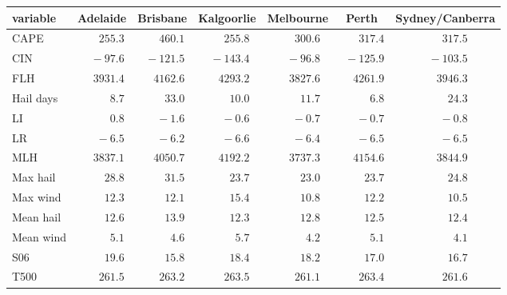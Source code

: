\begin{tabular}{lcccccc}
\hline
variable  & Adelaide & Brisbane & Kalgoorlie & Melbourne & Perth & \multicolumn{1}{c}{Sydney/Canberra} \\ 
\hline
CAPE  & $\phantom{0}\phantom{-}255.3$ & $\phantom{0}\phantom{-}460.1$ & $\phantom{0}\phantom{-}255.8$ & $\phantom{0}\phantom{-}300.6$ & $\phantom{0}\phantom{-}317.4$ & $\phantom{0}\phantom{-}317.5$ \\
CIN  & $\phantom{00}-97.6$ & $\phantom{0}-121.5$ & $\phantom{0}-143.4$ & $\phantom{00}-96.8$ & $\phantom{0}-125.9$ & $\phantom{0}-103.5$ \\
FLH  & $\phantom{-}3931.4$ & $\phantom{-}4162.6$ & $\phantom{-}4293.2$ & $\phantom{-}3827.6$ & $\phantom{-}4261.9$ & $\phantom{-}3946.3$ \\
Hail days  & $\phantom{000}\phantom{-}8.7$ & $\phantom{00}\phantom{-}33.0$ & $\phantom{00}\phantom{-}10.0$ & $\phantom{00}\phantom{-}11.7$ & $\phantom{000}\phantom{-}6.8$ & $\phantom{00}\phantom{-}24.3$ \\
LI  & $\phantom{000}\phantom{-}0.8$ & $\phantom{000}-1.6$ & $\phantom{000}-0.6$ & $\phantom{000}-0.7$ & $\phantom{000}-0.7$ & $\phantom{000}-0.8$ \\
LR  & $\phantom{000}-6.5$ & $\phantom{000}-6.2$ & $\phantom{000}-6.6$ & $\phantom{000}-6.4$ & $\phantom{000}-6.5$ & $\phantom{000}-6.5$ \\
MLH  & $\phantom{-}3837.1$ & $\phantom{-}4050.7$ & $\phantom{-}4192.2$ & $\phantom{-}3737.3$ & $\phantom{-}4154.6$ & $\phantom{-}3844.9$ \\
Max hail  & $\phantom{00}\phantom{-}28.8$ & $\phantom{00}\phantom{-}31.5$ & $\phantom{00}\phantom{-}23.7$ & $\phantom{00}\phantom{-}23.0$ & $\phantom{00}\phantom{-}23.7$ & $\phantom{00}\phantom{-}24.8$ \\
Max wind  & $\phantom{00}\phantom{-}12.3$ & $\phantom{00}\phantom{-}12.1$ & $\phantom{00}\phantom{-}15.4$ & $\phantom{00}\phantom{-}10.8$ & $\phantom{00}\phantom{-}12.2$ & $\phantom{00}\phantom{-}10.5$ \\
Mean hail  & $\phantom{00}\phantom{-}12.6$ & $\phantom{00}\phantom{-}13.9$ & $\phantom{00}\phantom{-}12.3$ & $\phantom{00}\phantom{-}12.8$ & $\phantom{00}\phantom{-}12.5$ & $\phantom{00}\phantom{-}12.4$ \\
Mean wind  & $\phantom{000}\phantom{-}5.1$ & $\phantom{000}\phantom{-}4.6$ & $\phantom{000}\phantom{-}5.7$ & $\phantom{000}\phantom{-}4.2$ & $\phantom{000}\phantom{-}5.1$ & $\phantom{000}\phantom{-}4.1$ \\
S06  & $\phantom{00}\phantom{-}19.6$ & $\phantom{00}\phantom{-}15.8$ & $\phantom{00}\phantom{-}18.4$ & $\phantom{00}\phantom{-}18.2$ & $\phantom{00}\phantom{-}17.0$ & $\phantom{00}\phantom{-}16.7$ \\
T500  & $\phantom{0}\phantom{-}261.5$ & $\phantom{0}\phantom{-}263.2$ & $\phantom{0}\phantom{-}263.5$ & $\phantom{0}\phantom{-}261.1$ & $\phantom{0}\phantom{-}263.4$ & $\phantom{0}\phantom{-}261.6$ \\
\hline 
\end{tabular}

